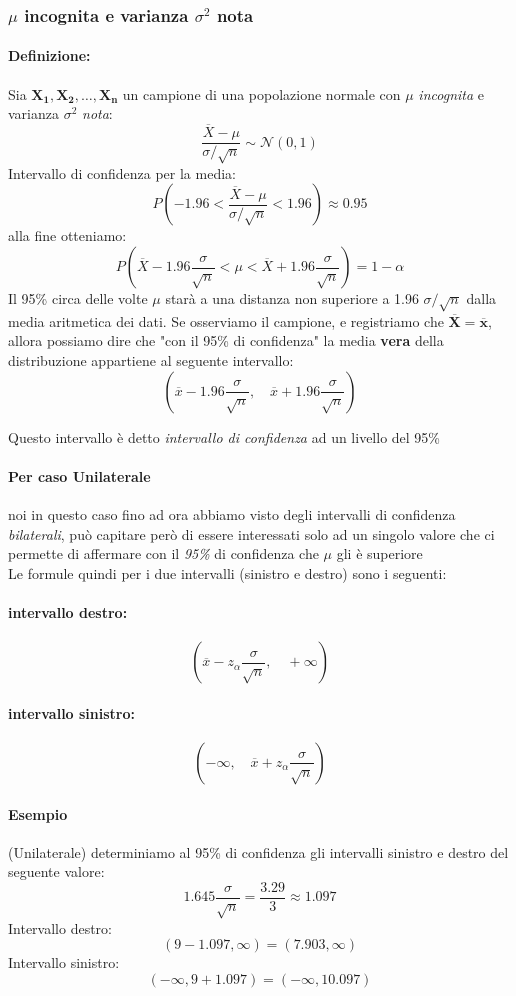 \documentclass[]{article}
\newcommand{\definizione}{\paragraph{Definizione:}}
\begin{document}
    \subsubsection{$\mu$ incognita e varianza  $\sigma^2$ nota}
    \definizione Sia $\boldsymbol{X_1, X_2, \ldots, X_n}$ un campione di una popolazione normale con $\mu$ \textit{incognita} e varianza $\sigma^2$ \textit{nota}:
    \[ \frac{\overline{X} - \mu}{\sigma / \sqrt{n}} \sim \mathcal{N}(0,1) \]
    Intervallo di confidenza per la media:
    \[ P \left( -1.96 < \frac{\overline{X} - \mu}{\sigma / \sqrt{n}} < 1.96 \right) \approx 0.95 \]
    alla fine otteniamo:
    \[ P \left( \overline{X} - 1.96 \frac{\sigma}{\sqrt{n}} < \mu < \overline{X} + 1.96 \frac{\sigma}{\sqrt{n}}\right) = 1-\alpha \]
    Il 95\% circa delle volte $\mu$ starà a una distanza non superiore a 1.96 $\sigma / \sqrt{n}$ dalla
    media aritmetica dei dati. Se osserviamo il campione, e registriamo che $\boldsymbol{\overline{X} = \overline{x}}$, allora possiamo dire che "con il 95\% di confidenza" la media \textbf{vera} della distribuzione appartiene al seguente intervallo:
    \[ \left( \overline{x} - 1.96 \frac{\sigma}{\sqrt{n}}, \quad \overline{x} + 1.96 \frac{\sigma}{\sqrt{n}} \right) \]
    \centerline{Questo intervallo è detto \textit{intervallo di confidenza} ad un livello del 95\%}
    \paragraph{Per caso Unilaterale} noi in questo caso fino ad ora abbiamo visto degli intervalli di confidenza \textit{bilaterali}, può capitare però di essere interessati solo ad un singolo valore che ci permette di affermare con il \textit{95\%} di confidenza che $\mu$ gli è superiore \\
    Le formule quindi per i due intervalli (sinistro e destro) sono i seguenti:
    \paragraph{intervallo destro:}
    \[ \left( \overline{x} - z_\alpha \frac{\sigma}{\sqrt{n}},\quad  +\infty \right) \]
    \paragraph{intervallo sinistro:}
    \[ \left( -\infty,\quad \overline{x} + z_\alpha \frac{\sigma}{\sqrt{n}} \right) \]
    \paragraph{Esempio} (Unilaterale) determiniamo al 95\% di confidenza gli intervalli sinistro e destro del seguente valore:
    \[ 1.645 \frac{\sigma}{\sqrt{n}} = \frac{3.29}{3} \approx 1.097 \]
    Intervallo destro:
    \[ (9-1.097, \infty) = (7.903, \infty) \]
    Intervallo sinistro:
    \[ (-\infty, 9+1.097) = (-\infty, 10.097) \]
\end{document}
